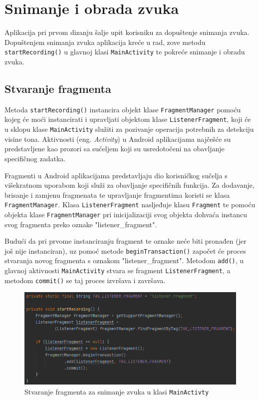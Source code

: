 \documentclass[times, utf8, zavrsni, numeric]{fer}
\begin{document}
\clearpage

\section{Snimanje i obrada zvuka}
Aplikacija pri prvom dizanju šalje upit korisniku za dopuštenje snimanja zvuka. Dopuštenjem snimanja zvuka aplikacija kreće u rad, zove metodu \verb|startRecording()| u glavnoj klasi \verb|MainActivity| te pokreće snimanje i obradu zvuka.

\subsection{Stvaranje fragmenta}
Metoda \verb|startRecording()| instancira objekt klase \verb|FragmentManager| pomoću kojeg će moći instancirati i upravljati objektom klase \verb|ListenerFragment|\cite{gstraube}, koji će u sklopu klase \verb|MainActivity| služiti za pozivanje operacija potrebnih za detekciju visine tona. Aktivnosti (eng. \textit{Activity}) u Android aplikacijama najčešće su predstavljene kao prozori sa sučeljem koji su usredotočeni na obavljanje specifičnog zadatka.

Fragmenti u Android aplikacijama predstavljaju dio korisničkog sučelja s višekratnom uporabom koji služi za obavljanje specifičnih funkcija. Za dodavanje, brisanje i zamjenu fragmenata te upravljanje fragmentima koristi se klasa \verb|FragmentManager|. Klasa \verb|ListenerFragment| nasljeđuje klasu \verb|Fragment| te pomoću objekta klase \verb|FragmentManager| pri inicijalizaciji svog objekta dohvaća instancu svog fragmenta preko oznake "listener\_fragment".

Budući da pri prvome instanciranju fragment te oznake neće biti pronađen (jer još nije instanciran), uz pomoć metode \verb|beginTransaction()| započet će proces stvaranja novog fragmenta s oznakom "listener\_fragment". Metodom \verb|add()|, u glavnoj aktivnosti \verb|MainActivity| stvara se fragment \verb|ListenerFragment|, a metodom \verb|commit()| se taj proces izvršava i završava.

\clearpage
\renewcommand{\figurename}{Kod}
\begin{figure}
	\centerline{\includegraphics[width=\textwidth]{kod_startRecording.png}}
	\cprotect\caption{Stvaranje fragmenta za snimanje zvuka u klasi \verb|MainActivty|}
	\label{fig}
\end{figure}
\end{document}
